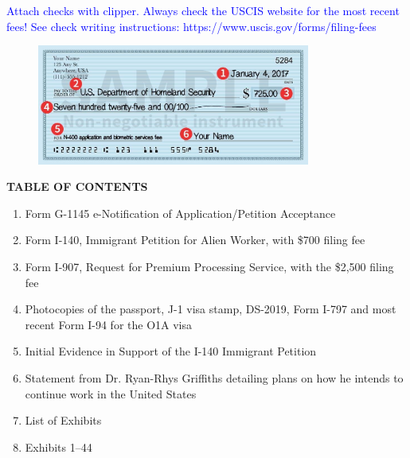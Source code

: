 \documentclass[11pt]{article}
\title{}
\date{}
\begin{document}
\newcommand{\tc}[1]{\textcolor{blue}{#1}}

\tc{Attach checks with clipper. Always check the USCIS website for the most recent fees! See check writing instructions: https://www.uscis.gov/forms/filing-fees}

\begin{figure}
\includegraphics[width=0.8\textwidth]{aux/check.jpeg}
\end{figure}

\vspace*{5em}

\begin{center}
\Large{\textbf{TABLE OF CONTENTS}} 
\end{center}

\begin{enumerate}
 \item Form G-1145 e-Notification of Application/Petition Acceptance
 \item Form I-140, Immigrant Petition for Alien Worker, with \$700 filing fee
 \item Form I-907, Request for Premium Processing Service, with the \$2,500 filing fee
 \item Photocopies of the passport, J-1 visa stamp, DS-2019, Form I-797 and most recent Form I-94 for the O1A visa
 \item Initial Evidence in Support of the I-140 Immigrant Petition
 \item Statement from Dr. Ryan-Rhys Griffiths detailing plans on how he intends to continue work in the United States
 \item List of Exhibits
 \item Exhibits 1--44
\end{enumerate}

\end{document}
